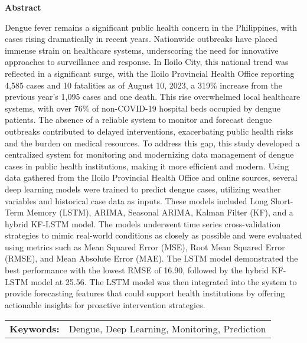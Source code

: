 
\begin{center}
	\textbf{Abstract}
\end{center}

{\small
	\begin{spacing}{1.5}  %
		Dengue fever remains a significant public health concern in the Philippines, with cases rising dramatically in recent years. Nationwide outbreaks have placed immense strain on healthcare systems, underscoring the need for innovative approaches to surveillance and response. In Iloilo City, this national trend was reflected in a significant surge, with the Iloilo Provincial Health Office reporting 4,585 cases and 10 fatalities as of August 10, 2023, a 319\% increase from the previous year’s 1,095 cases and one death. This rise overwhelmed local healthcare systems, with over 76\% of non-COVID-19 hospital beds occupied by dengue patients. The absence of a reliable system to monitor and forecast dengue outbreaks contributed to delayed interventions, exacerbating public health risks and the burden on medical resources. To address this gap, this study developed a centralized system for monitoring and modernizing data management of dengue cases in public health institutions, making it more efficient and modern. Using data gathered from the Iloilo Provincial Health Office and online sources, several deep learning models were trained to predict dengue cases, utilizing weather variables and historical case data as inputs. These models included Long Short-Term Memory (LSTM), ARIMA, Seasonal ARIMA, Kalman Filter (KF), and a hybrid KF-LSTM model. The models underwent time series cross-validation strategies to mimic real-world conditions as closely as possible and were evaluated using metrics such as Mean Squared Error (MSE), Root Mean Squared Error (RMSE), and Mean Absolute Error (MAE). The LSTM model demonstrated the best performance with the lowest RMSE of 16.90, followed by the hybrid KF-LSTM model at 25.56. The LSTM model was then integrated into the system to provide forecasting features that could support health institutions by offering actionable insights for proactive intervention strategies.
	\end{spacing}
}

\vspace{0.5em}
\begin{tabular}{lp{4.25in}}
	\hspace{-0.5em}\textbf{Keywords:}\hspace{0.25em} & Dengue, Deep Learning, Monitoring, Prediction \\
\end{tabular}

